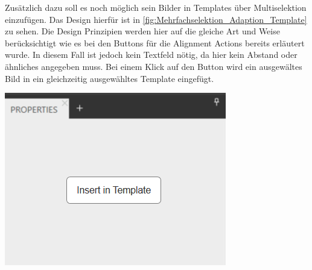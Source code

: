 Zusätzlich dazu soll es noch möglich sein Bilder in Templates über Multiselektion einzufügen.
Das Design hierfür ist in \cref{fig:Mehrfachselektion_Adaption_Template} zu sehen.
Die Design Prinzipien werden hier auf die gleiche Art und Weise berücksichtigt wie es bei den Buttons für die Alignment Actions bereits erläutert wurde.
In diesem Fall ist jedoch kein Textfeld nötig, da hier kein Abstand oder ähnliches angegeben muss.
Bei einem Klick auf den Button wird ein ausgewältes Bild in ein gleichzeitig ausgewähltes Template eingefügt.

\begin{center}
  \includegraphics[scale=0.8]{figures/Mehrfachselektion_Adaption03.png}
  \label{fig:Mehrfachselektion_Adaption_Template}
\end{center}



